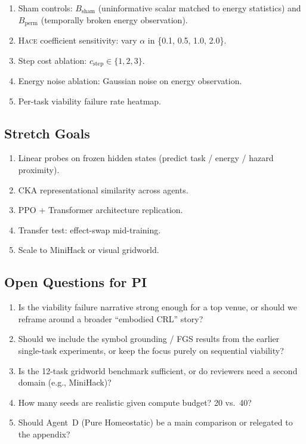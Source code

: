 \documentclass{article}
\newcommand{\hace}{\textsc{Hace}}
\begin{document}
\begin{enumerate}[leftmargin=*]
  \item Sham controls: $B_{\text{sham}}$ (uninformative scalar matched
        to energy statistics) and $B_{\text{perm}}$ (temporally broken
        energy observation).
  \item \hace{} coefficient sensitivity: vary $\alpha$ in
        \{0.1, 0.5, 1.0, 2.0\}.
  \item Step cost ablation: $c_{\text{step}} \in \{1, 2, 3\}$.
  \item Energy noise ablation: Gaussian noise on energy observation.
  \item Per-task viability failure rate heatmap.
\end{enumerate}

\subsection*{Stretch Goals}

\begin{enumerate}[leftmargin=*]
  \item Linear probes on frozen hidden states (predict task / energy /
        hazard proximity).
  \item CKA representational similarity across agents.
  \item PPO + Transformer architecture replication.
  \item Transfer test: effect-swap mid-training.
  \item Scale to MiniHack or visual gridworld.
\end{enumerate}

\subsection*{Open Questions for PI}

\begin{enumerate}[leftmargin=*]
  \item Is the viability failure narrative strong enough for a top venue,
        or should we reframe around a broader ``embodied CRL'' story?
  \item Should we include the symbol grounding / FGS results from the
        earlier single-task experiments, or keep the focus purely on
        sequential viability?
  \item Is the 12-task gridworld benchmark sufficient, or do reviewers
        need a second domain (e.g., MiniHack)?
  \item How many seeds are realistic given compute budget? 20 vs.\ 40?
  \item Should Agent~D (Pure Homeostatic) be a main comparison or
        relegated to the appendix?
\end{enumerate}
\end{document}
